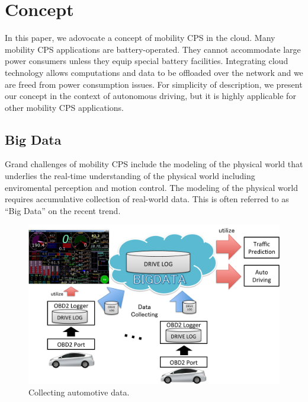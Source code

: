 \section{Concept}
\label{sec:concept}

In this paper, we adovocate a concept of mobility CPS in the cloud.
Many mobility CPS applications are battery-operated.
They cannot accommodate large power consumers unless they equip special
battery facilities.
Integrating cloud technology allows computations and data to be
offloaded over the network and we are freed from power consumption
issues.
For simplicity of description, we present our concept in the context of
autonomous driving, but it is highly applicable for other mobility CPS
applications.

\subsection{Big Data}

Grand challenges of mobility CPS include the modeling of the physical
world that underlies the real-time understanding of the physical world
including enviromental perception and motion control.
The modeling of the physical world requires accumulative collection of
real-world data.
This is often referred to as ``Big Data'' on the recent trend.

\begin{figure}[!t]
 \centering
 \includegraphics[width=\hsize]{fig/OBD2.pdf}
 \caption{Collecting automotive data.}
 \label{fig:obd2}
\end{figure}

